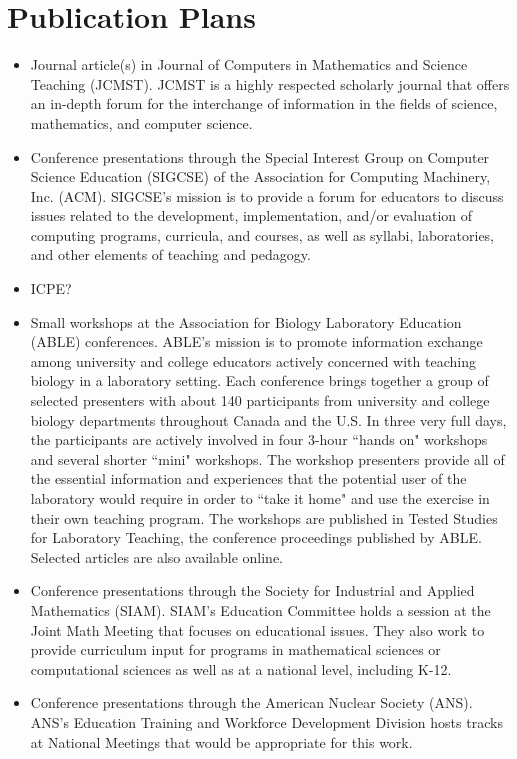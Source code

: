 \documentclass[11pt]{article}
\begin{document}
\section{Publication Plans}

\begin{itemize}
\item Journal article(s) in Journal of Computers in Mathematics and Science Teaching (JCMST). JCMST is a highly respected scholarly journal that offers an in-depth forum for the interchange of information in the fields of science, mathematics, and computer science.
%
\item Conference presentations through the Special Interest Group on Computer Science Education (SIGCSE) of the Association for Computing Machinery, Inc. (ACM). SIGCSE's mission is to provide a forum for educators to discuss issues related to the development, implementation, and/or evaluation of computing programs, curricula, and courses, as well as syllabi, laboratories, and other elements of teaching and pedagogy.
%
\item ICPE?
%
\item Small workshops at the Association for Biology Laboratory Education (ABLE) conferences. ABLE's mission is to promote information exchange among university and college educators actively concerned with teaching biology in a laboratory setting. Each conference brings together a group of selected presenters with about 140 participants from university and college biology departments throughout Canada and the U.S. In three very full days, the participants are actively involved in four 3-hour ``hands on" workshops and several shorter ``mini" workshops. The workshop presenters provide all of the essential information and experiences that the potential user of the laboratory would require in order to ``take it home" and use the exercise in their own teaching program. The workshops are published in Tested Studies for Laboratory Teaching, the conference proceedings published by ABLE. Selected articles are also available online. 
%
\item Conference presentations through the Society for Industrial and Applied Mathematics (SIAM). SIAM's Education Committee holds a session at the Joint Math Meeting that focuses on educational issues. They also work to provide curriculum input for programs in mathematical sciences or computational sciences as well as at a national level, including K-12.
%
\item Conference presentations through the American Nuclear Society (ANS). ANS's Education Training and Workforce Development Division hosts tracks at National Meetings that would be appropriate for this work. 
\end{itemize}
\end{document}
